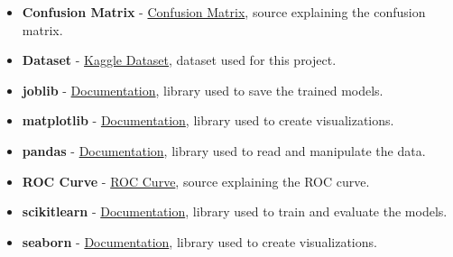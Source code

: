 \begin{itemize}
    \item \textbf{Confusion Matrix} - \href{https://en.wikipedia.org/wiki/Confusion_matrix}{Confusion Matrix}, source explaining the confusion matrix.
    \item \textbf{Dataset} - \href{https://www.kaggle.com/datasets/kamilpytlak/personal-key-indicators-of-heart-disease}{Kaggle Dataset}, dataset used for this project.
    \item \textbf{joblib} - \href{https://joblib.readthedocs.io/en/stable/}{Documentation}, library used to save the trained models.
    \item \textbf{matplotlib} - \href{https://matplotlib.org/stable/contents.html}{Documentation}, library used to create visualizations.
    \item \textbf{pandas} - \href{https://pandas.pydata.org/docs/}{Documentation}, library used to read and manipulate the data.
    \item \textbf{ROC Curve} - \href{https://en.wikipedia.org/wiki/Receiver_operating_characteristic}{ROC Curve}, source explaining the ROC curve.
    \item \textbf{scikitlearn} - \href{https://scikit-learn.org/0.21/documentation.html}{Documentation}, library used to train and evaluate the models.
    \item \textbf{seaborn} - \href{https://seaborn.pydata.org/}{Documentation}, library used to create visualizations.
\end{itemize}
